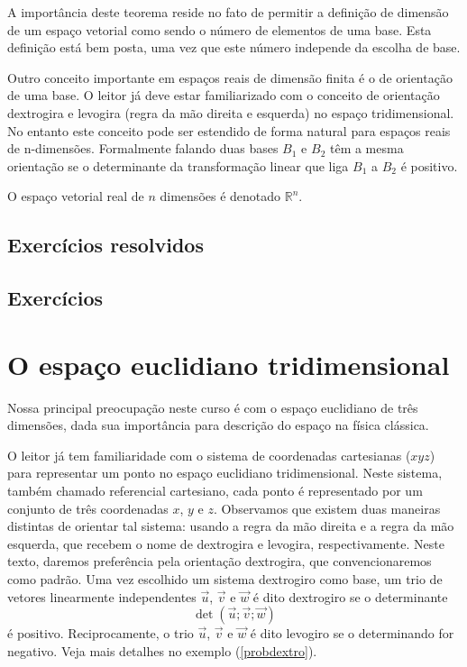 A importância deste teorema reside no fato de permitir a definição de dimensão de um espaço vetorial como sendo o número de elementos de uma base. Esta definição está bem posta, uma vez que este número independe da escolha de base.

Outro conceito importante em espaços reais de dimensão finita é o de orientação de uma base. O leitor já deve estar familiarizado com o conceito de orientação dextrogira e levogira (regra da mão direita e esquerda) no espaço tridimensional. No entanto este conceito pode ser estendido de forma natural para espaços reais de n-dimensões. Formalmente falando duas bases $B_1$ e $B_2$ têm a mesma orientação se o determinante da transformação linear que liga $B_1$ a $B_2$ é positivo.

O espaço vetorial real de $n$ dimensões é denotado $\mathbb{R}^n$.

\subsection*{Exercícios resolvidos}

\construirExeresol

\subsection*{Exercícios}

\construirExer


\section{O espaço euclidiano tridimensional}
Nossa principal preocupação neste curso é com o espaço euclidiano de três dimensões, dada sua importância para descrição do espaço na física clássica.

O leitor já tem familiaridade com o sistema de coordenadas cartesianas ($xyz$) para representar um ponto no espaço euclidiano tridimensional. Neste sistema, também chamado referencial cartesiano, cada ponto é representado por um conjunto de três coordenadas $x$, $y$ e $z$. Observamos que existem duas maneiras distintas de orientar tal sistema: usando a regra da mão direita e a regra da mão esquerda, que recebem o nome de dextrogira e levogira, respectivamente. Neste texto, daremos preferência pela orientação dextrogira, que convencionaremos como padrão. Uma vez escolhido um sistema dextrogiro como base,  um trio de vetores linearmente independentes $\vec{u}$, $\vec{v}$ e  $\vec{w}$ é dito dextrogiro se o determinante
\begin{equation}\label{defdextro}
\det\left(\vec{u};\vec{v};\vec{w}\right)
\end{equation}
é positivo. Reciprocamente, o trio  $\vec{u}$, $\vec{v}$ e  $\vec{w}$ é dito levogiro se o determinando for negativo. Veja mais detalhes no exemplo (\ref{probdextro}).

